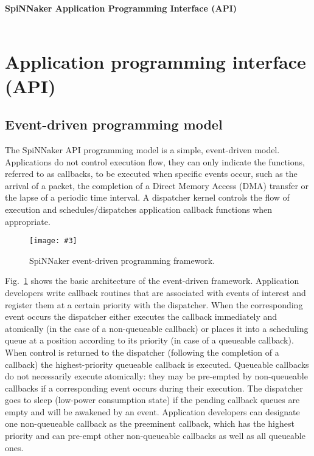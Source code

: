 \documentclass[11pt,a4paper,twoside]{article}
\newcommand{\image}[5][]
{
\begin{figure}[#2]
   \begin{center}
      \texttt{[image: \#3]}
      \caption{#5}
      \label{fig:#4}
   \end{center}
\end{figure}
}
\begin{document}
\vspace*{5.0cm}

\begin{center}
\textbf{
\Large{SpiNNaker Application Programming Interface (API)} \\
\vspace*{0.5cm}
\large {\myversion} \\
\vspace*{0.5cm}
\large{\mydate}
}
\end{center}

\vspace*{\fill}

\thispagestyle{empty}

\pagebreak

\section*{Application programming interface (API)}
\label{sec:spinn_api}

\def\fcw{45mm}
\def\tblf{| \fcw X X |}
\def\tblc{green!15}

\subsection{Event-driven programming model}
\label{sec:PM}

The SpiNNaker API programming model is a simple, event-driven
model. Applications do not control execution flow, they can only
indicate the functions, referred to as callbacks, to be executed when
specific events occur, such as the arrival of a packet, the completion
of a Direct Memory Access (DMA) transfer or the lapse of a periodic
time interval. A dispatcher kernel controls the flow of execution and
schedules/dispatches application callback functions when appropriate.

\image[scale=0.75]{!h}{threads}{PM}{SpiNNaker event-driven programming framework.}

Fig.~\ref{fig:PM} shows the basic architecture of the event-driven
framework. Application developers write callback routines that are
associated with events of interest and register them at a certain
priority with the dispatcher. When the corresponding event occurs the
dispatcher either executes the callback immediately and atomically (in
the case of a non-queueable callback) or places it into a scheduling
queue at a position according to its priority (in case of a queueable
callback). When control is returned to the dispatcher (following the
completion of a callback) the highest-priority queueable callback is
executed. Queueable callbacks do not necessarily execute atomically:
they may be pre-empted by non-queueable callbacks if a corresponding
event occurs during their execution. The dispatcher goes to sleep
(low-power consumption state) if the pending callback queues are empty
and will be awakened by an event. Application developers can designate
one non-queueable callback as the preeminent callback, which has the
highest priority and can pre-empt other non-queueable callbacks as
well as all queueable ones.
\end{document}
